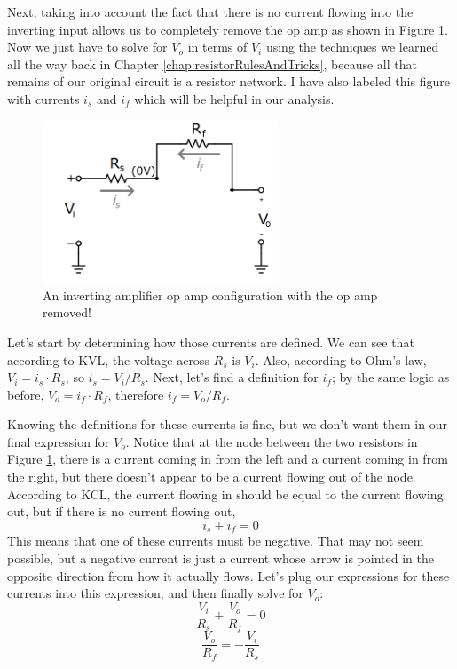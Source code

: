 \par
Next, taking into account the fact that there is no current flowing into the inverting input allows us to completely remove the op amp as shown in Figure \ref{invertingAmplifier3}. Now we just have to solve for $V_o$ in terms of $V_i$ using the techniques we learned all the way back in Chapter \ref{chap:resistorRulesAndTricks}, because all that remains of our original circuit is a resistor network. I have also labeled this figure with currents $i_s$ and $i_f$ which will be helpful in our analysis.
\begin{figure}[h!]
\centering
\includegraphics[width=7cm]{figures/invertingAmplifier3.png}
\caption{An inverting amplifier op amp configuration with the op amp removed!}
\label{invertingAmplifier3}
\end{figure}
\par
Let's start by determining how those currents are defined. We can see that according to KVL, the voltage across $R_s$ is $V_i$. Also, according to Ohm's law, $V_i = i_s\cdot R_s$, so $i_s = V_i/R_s$. Next, let's find a definition for $i_f$; by the same logic as before, $V_o = i_f\cdot R_f$, therefore $i_f = V_o/R_f$.
\par
Knowing the definitions for these currents is fine, but we don't want them in our final expression for $V_o$. Notice that at the node between the two resistors in Figure \ref{invertingAmplifier3}, there is a current coming in from the left and a current coming in from the right, but there doesn't appear to be a current flowing out of the node. According to KCL, the current flowing in should be equal to the current flowing out, but if there is no current flowing out, 
$$
i_s + i_f = 0
$$
This means that one of these currents must be negative. That may not seem possible, but a negative current is just a current whose arrow is pointed in the opposite direction from how it actually flows. Let's plug our expressions for these currents into this expression, and then finally solve for $V_o$:
$$
\frac{V_i}{R_s} + \frac{V_o}{R_f} = 0
$$
$$
\frac{V_o}{R_f} = -\frac{V_i}{R_s}
$$
